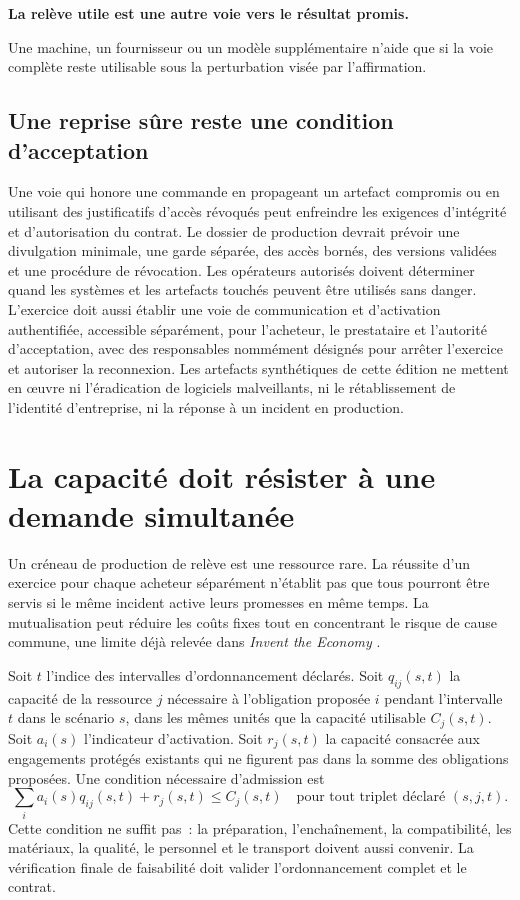 \documentclass[11pt,a4paper]{article}
\begin{document}
\begin{insight}
\textbf{La relève utile est une autre voie vers le résultat promis.}\par
Une machine, un fournisseur ou un modèle supplémentaire n’aide que si la voie complète reste utilisable sous la perturbation visée par l’affirmation.
\end{insight}

\subsection{Une reprise sûre reste une condition d’acceptation}
Une voie qui honore une commande en propageant un artefact compromis ou en utilisant des justificatifs d’accès révoqués peut enfreindre les exigences d’intégrité et d’autorisation du contrat. Le dossier de production devrait prévoir une divulgation minimale, une garde séparée, des accès bornés, des versions validées et une procédure de révocation. Les opérateurs autorisés doivent déterminer quand les systèmes et les artefacts touchés peuvent être utilisés sans danger. L’exercice doit aussi établir une voie de communication et d’activation authentifiée, accessible séparément, pour l’acheteur, le prestataire et l’autorité d’acceptation, avec des responsables nommément désignés pour arrêter l’exercice et autoriser la reconnexion. Les artefacts synthétiques de cette édition ne mettent en œuvre ni l’éradication de logiciels malveillants, ni le rétablissement de l’identité d’entreprise, ni la réponse à un incident en production.

\section{La capacité doit résister à une demande simultanée}\label{sec:capacity}
Un créneau de production de relève est une ressource rare. La réussite d’un exercice pour chaque acheteur séparément n’établit pas que tous pourront être servis si le même incident active leurs promesses en même temps. La mutualisation peut réduire les coûts fixes tout en concentrant le risque de cause commune, une limite déjà relevée dans \emph{Invent the Economy} \cite[section 12.2]{boucherEconomy}.

Soit $t$ l’indice des intervalles d’ordonnancement déclarés. Soit $q_{ij}(s,t)$ la capacité de la ressource $j$ nécessaire à l’obligation proposée $i$ pendant l’intervalle $t$ dans le scénario $s$, dans les mêmes unités que la capacité utilisable $C_j(s,t)$. Soit $a_i(s)$ l’indicateur d’activation. Soit $r_j(s,t)$ la capacité consacrée aux engagements protégés existants qui ne figurent pas dans la somme des obligations proposées. Une condition nécessaire d’admission est
\begin{equation}
\sum_i a_i(s)q_{ij}(s,t)+r_j(s,t)\leq C_j(s,t)
\quad\text{pour tout triplet déclaré }(s,j,t).
\label{eq:capacity}
\end{equation}
Cette condition ne suffit pas~: la préparation, l’enchaînement, la compatibilité, les matériaux, la qualité, le personnel et le transport doivent aussi convenir. La vérification finale de faisabilité doit valider l’ordonnancement complet et le contrat.
\end{document}

